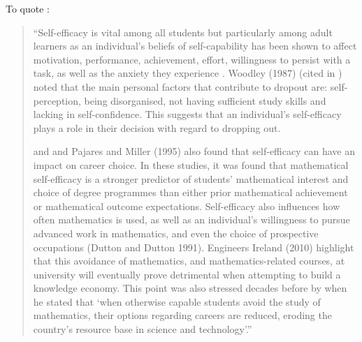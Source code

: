 \documentclass[twoside,12pt,a4paper]{report}
\begin{document}
To quote :
\begin{quote}
``Self-efficacy
is vital among all students but particularly among adult learners as an individual’s
beliefs of self-capability has been shown to affect motivation, performance, achievement, effort, willingness to persist with a task, as well as the anxiety they experience
\cite{Bandura1997, Pajares1994, Pajares1996, Pajares1997, Pajares1999}. Woodley (1987) (cited in \cite{McGivney1996}) noted that the main personal
factors that contribute to dropout are: self-perception, being disorganised, not
having sufficient study skills and lacking in self-confidence. This suggests that an individual's self-efficacy plays a role in their decision with regard to dropping out.

\cite{Hackett1989} and \cite{Pajares1994} and Pajares and Miller (1995) also found that self-efficacy can have an impact on career choice. In these studies, it was found that mathematical self-efficacy is a stronger predictor of students’ mathematical interest and
choice of degree programmes than either prior mathematical achievement or mathematical outcome expectations. Self-efficacy also influences how often mathematics
is used, as well as an individual's willingness to pursue advanced work in mathematics,
and even the choice of prospective occupations (Dutton and Dutton 1991). Engineers
Ireland (2010) highlight that this avoidance of mathematics, and mathematics-related
courses, at university will eventually prove detrimental when attempting to build a
knowledge economy. This point was also stressed decades before by \cite[pg34]{Hembree1990}
when he stated that ‘when otherwise capable students avoid the study of
mathematics, their options regarding careers are reduced, eroding the country's
resource base in science and technology’.''
\end{quote}
\end{document}
